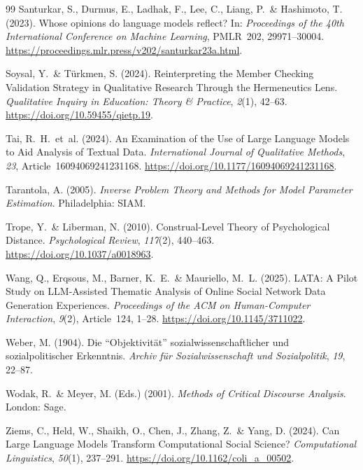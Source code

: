 \documentclass[11pt,a4paper]{article}
\begin{document}
\begin{thebibliography}{99}
  Santurkar, S., Durmus, E., Ladhak, F., Lee, C., Liang, P.~\& Hashimoto, T. (2023).
  Whose opinions do language models reflect?
  In: \textit{Proceedings of the 40th International Conference on Machine Learning}, PMLR~202, 29971--30004. \url{https://proceedings.mlr.press/v202/santurkar23a.html}.

  Soysal, Y.~\& Türkmen, S. (2024).
  Reinterpreting the Member Checking Validation Strategy in Qualitative Research Through the Hermeneutics Lens.
  \textit{Qualitative Inquiry in Education: Theory \& Practice}, \textit{2}(1), 42--63. \url{https://doi.org/10.59455/qietp.19}.

  Tai, R.~H.~et~al. (2024).
  An Examination of the Use of Large Language Models to Aid Analysis of Textual Data.
  \textit{International Journal of Qualitative Methods}, \textit{23}, Article~16094069241231168. \url{https://doi.org/10.1177/16094069241231168}.

  Tarantola, A. (2005).
  \textit{Inverse Problem Theory and Methods for Model Parameter Estimation}.
  Philadelphia: SIAM.

  Trope, Y.~\& Liberman, N. (2010).
  Construal-Level Theory of Psychological Distance.
  \textit{Psychological Review}, \textit{117}(2), 440--463. \url{https://doi.org/10.1037/a0018963}.

  Wang, Q., Erqsous, M., Barner, K.~E.~\& Mauriello, M.~L. (2025).
  LATA: A Pilot Study on LLM-Assisted Thematic Analysis of Online Social Network Data Generation Experiences.
  \textit{Proceedings of the ACM on Human-Computer Interaction}, \textit{9}(2), Article~124, 1--28. \url{https://doi.org/10.1145/3711022}.

  Weber, M. (1904).
  Die ``Objektivität'' sozialwissenschaftlicher und sozialpolitischer Erkenntnis.
  \textit{Archiv für Sozialwissenschaft und Sozialpolitik}, \textit{19}, 22--87.

  Wodak, R.~\& Meyer, M. (Eds.) (2001).
  \textit{Methods of Critical Discourse Analysis}.
  London: Sage.

  Ziems, C., Held, W., Shaikh, O., Chen, J., Zhang, Z.~\& Yang, D. (2024).
  Can Large Language Models Transform Computational Social Science?
  \textit{Computational Linguistics}, \textit{50}(1), 237--291. \url{https://doi.org/10.1162/coli_a_00502}.

\end{thebibliography}
\end{document}
